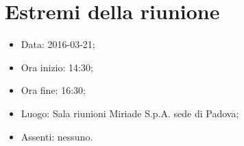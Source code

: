 \documentclass[../template.tex]{subfiles}
\begin{document}
\section{Estremi della riunione}
	\begin{itemize}
		\item Data: 2016-03-21;
		\item Ora inizio: 14:30;
		\item Ora fine: 16:30;
		\item Luogo: Sala riunioni Miriade S.p.A. sede di Padova;
		\item Assenti: nessuno.
	\end{itemize}
\end{document}
